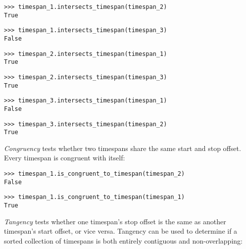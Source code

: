 \begin{singlespacing}
\vspace{-0.5\baselineskip}
\begin{lstlisting}
>>> timespan_1.intersects_timespan(timespan_2)
True
\end{lstlisting}
\begin{lstlisting}
>>> timespan_1.intersects_timespan(timespan_3)
False
\end{lstlisting}
\begin{lstlisting}
>>> timespan_2.intersects_timespan(timespan_1)
True
\end{lstlisting}
\begin{lstlisting}
>>> timespan_2.intersects_timespan(timespan_3)
True
\end{lstlisting}
\begin{lstlisting}
>>> timespan_3.intersects_timespan(timespan_1)
False
\end{lstlisting}
\begin{lstlisting}
>>> timespan_3.intersects_timespan(timespan_2)
True
\end{lstlisting}
\end{singlespacing}

\noindent \emph{Congruency} tests whether two timespans share the same start
and stop offset. Every timespan is congruent with itself:

\begin{comment}
<abjad>
timespan_1.is_congruent_to_timespan(timespan_2)
timespan_1.is_congruent_to_timespan(timespan_1)
</abjad>
\end{comment}

\begin{singlespacing}
\vspace{-0.5\baselineskip}
\begin{lstlisting}
>>> timespan_1.is_congruent_to_timespan(timespan_2)
False
\end{lstlisting}
\begin{lstlisting}
>>> timespan_1.is_congruent_to_timespan(timespan_1)
True
\end{lstlisting}
\end{singlespacing}

\noindent \emph{Tangency} tests whether one timespan's stop offset is the same
as another timespan's start offset, or vice versa. Tangency can be used to
determine if a sorted collection of timespans is both entirely contiguous and
non-overlapping:

